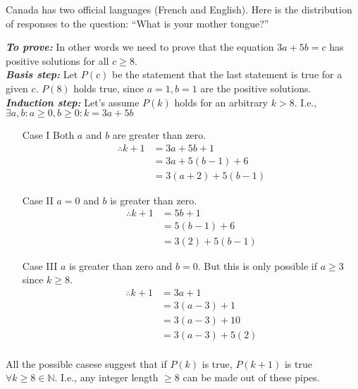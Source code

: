 \documentclass[boxes, qed]{homework}
\begin{document}
\newenvironment{amatrix}[1]{%
  \left[\begin{array}{@{}*{#1}{c}|c@{}}
}{%
  \end{array}\right]
}

\newenvironment{augmatrix}[1]{%
  \left[\begin{array}{#1}
}{%
  \end{array}\right]
}

\begin{problem}
  Canada has two official languages (French and English). Here is the distribution of responses
  to the question: “What is your mother tongue?”\end{problem}
\begin{solution}
    \textbf{\textit{To prove:}} In other words we need to prove that the equation
    $3a + 5b = c$
    has positive solutions for all $c \ge 8$.\\

    \textbf{\textit{Basis step:}} Let $P(c)$ be the statement that the last statement is true for
    a given $c$. $P(8)$ holds true, since $a=1, b=1$ 
    are the positive solutions.\\

    \textbf{\textit{Induction step:}} Let's assume $P(k)$ holds for an arbitrary
    $k>8$. I.e., 
    $\exists a,b
    : a\ge{0},b\ge{0}
    : k=3a+5b$

    \begin{enumerate}
        \item[Case I] Both $a$ and $b$ are greater than zero.
        \begin{align*}
            \therefore k+1 &= 3a + 5b + 1 \\
            & = 3a + 5(b-1) + 6 \\
            & = 3(a+2) + 5(b-1)
        \end{align*}
        \item[Case II] $a=0$ and $b$ is greater than zero.
        \begin{align*}
            \therefore k+1 &= 5b + 1 \\
            & = 5(b-1) + 6 \\
            & = 3(2) + 5(b-1)
        \end{align*}
        \item[Case III] $a$ is greater than zero and $b=0$. 
        But this is only possible if
        $a\ge{3}$ since $k\ge{8}$.
        \begin{align*}
            \therefore k+1 &= 3a + 1 \\
            & = 3(a-3) + 1 \\
            & = 3(a-3) + 10\\
            & = 3(a-3) + 5(2)\\
        \end{align*}
    \end{enumerate}
    All the possible casese suggest that if $P(k)$ is true,
    $P(k+1)$ is true $\forall{k}\ge{8}\in{\mathbb{N}}$.
    I.e., any integer length $\ge{8}$ can be made out of
    these pipes.
\end{solution}
\end{document}

